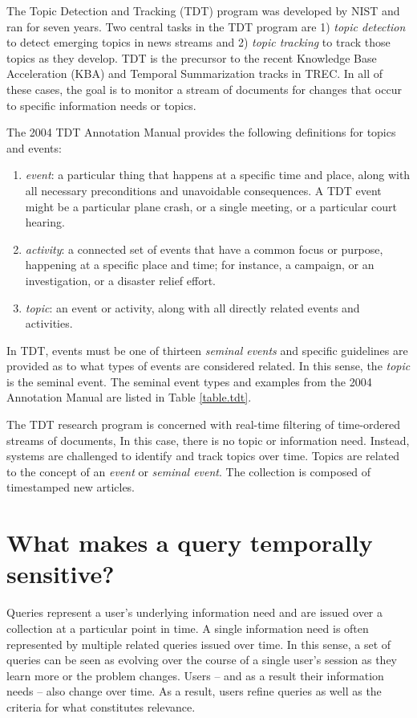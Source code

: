 \documentclass{sig-alternate}
\begin{document}
The Topic Detection and Tracking (TDT) program was developed by NIST and ran for seven years.  Two central tasks in the TDT program are 1) \emph{topic detection} to detect emerging topics in news streams and 2) \emph{topic tracking} to track those topics as they develop. TDT is the precursor to the recent Knowledge Base Acceleration (KBA) and Temporal Summarization tracks in TREC. In all of these cases, the goal is to monitor a stream of documents for changes that occur to specific information needs or topics.

The 2004 TDT Annotation Manual provides the following definitions for topics and events:

\begin{enumerate}
\item \emph{event}:  a particular thing that happens at a specific time and place, along with all necessary preconditions and unavoidable consequences. A
TDT event might be a particular plane crash, or a single meeting, or a particular court hearing. 
\item \emph{activity}:  a connected set of events that have a common focus or purpose, happening at a specific place and time; for instance, a
campaign, or an investigation, or a disaster relief effort. 
\item \emph{topic}: an event or activity, along with all directly related events and activities. 
\end{enumerate}

In TDT, events must be one of thirteen \emph{seminal events} and specific guidelines are provided as to what types of events are considered related.  In this sense, the \emph{topic} is the seminal event. The seminal event types and  examples from the 2004 Annotation Manual are listed in Table \ref{table.tdt}. 


The TDT research program is concerned with real-time filtering of time-ordered streams of documents, In this case, there is no topic or information need. Instead, systems are challenged to identify and track topics over time. Topics are related to the concept of an \emph{event} or \emph{seminal event}.  The collection is composed of timestamped new articles.


\section{What makes a query temporally sensitive?}

Queries represent a user's underlying information need and are issued over a collection at a particular point in time.  A single information need is often represented by multiple related queries issued over time. In this sense, a set of queries can be seen as evolving over the course of a single user's session as they learn more or the problem changes. Users -- and as a result their information needs -- also change over time. As a result, users refine queries as well as the criteria for what constitutes relevance. 
\end{document}
